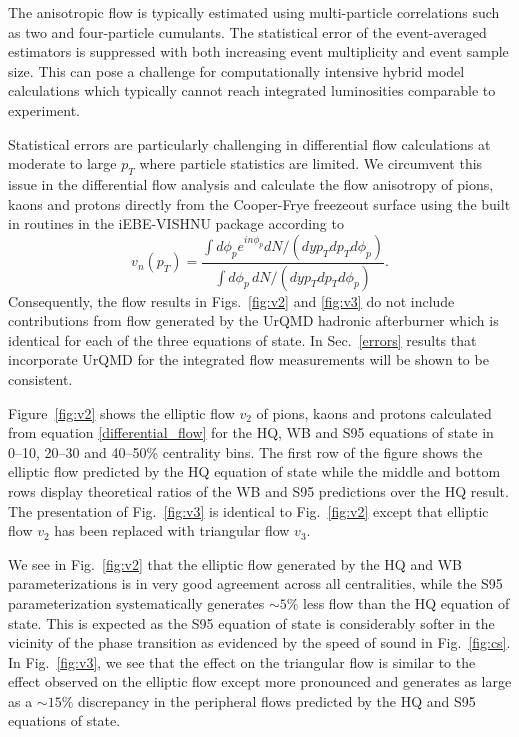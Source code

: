 \documentclass[aps,prc,reprint,amsmath,nofootinbib,superscriptaddress]{revtex4-1}
\begin{document}
The anisotropic flow is typically estimated using multi-particle correlations such as two and four-particle cumulants. The statistical error of the event-averaged estimators is suppressed with both increasing event multiplicity and event sample size. This can pose a challenge for computationally intensive hybrid model calculations which typically cannot reach integrated luminosities comparable to experiment. 

Statistical errors are particularly challenging in differential flow calculations at moderate to large $p_T$ where particle statistics are limited. We circumvent this issue in the differential flow analysis and calculate the flow anisotropy of pions, kaons and protons directly from the Cooper-Frye freezeout surface using the built in routines in the iEBE-VISHNU package according to
\begin{equation}
 \label{differential_flow}
 v_n(p_T) = \frac{\int d\phi_p e^{i n \phi_p} dN/(dy p_T dp_T d\phi_p)}{\int d\phi_p\, dN/(dy p_T dp_T d\phi_p)}.
\end{equation}
Consequently, the flow results in Figs.~\ref{fig:v2} and \ref{fig:v3} do not include contributions from flow generated by the UrQMD hadronic afterburner which is identical for each of the three equations of state.  In Sec.~\ref{errors} results that incorporate UrQMD for the integrated flow measurements will be shown to be consistent.

Figure~\ref{fig:v2} shows the elliptic flow $v_2$ of pions, kaons and protons calculated from equation \eqref{differential_flow} for the HQ, WB and S95 equations of state in 0--10, 20--30 and 40--50\% centrality bins. 
The first row of the figure shows the elliptic flow predicted by the HQ equation of state while the middle and bottom rows display theoretical ratios of the WB and S95 predictions over the HQ result. The presentation
of Fig.~\ref{fig:v3} is identical to Fig.~\ref{fig:v2} except that elliptic flow $v_2$ has been replaced with triangular flow $v_3$.

We see in Fig.~\ref{fig:v2} that the elliptic flow generated by the HQ and WB parameterizations is in very good agreement across all centralities, while the S95 parameterization systematically generates $\sim \! 5\%$ less flow than the HQ equation of state. This is expected as the S95 equation of state is considerably softer in the vicinity of the phase transition as evidenced by the speed of sound in Fig.~\ref{fig:cs}.  In Fig.~\ref{fig:v3}, we see that the effect on the triangular flow is similar to the effect observed on the elliptic flow except more pronounced and generates as large as a $\sim \! 15\%$ discrepancy in the peripheral flows predicted by the HQ and S95 equations of state. 
\end{document}
